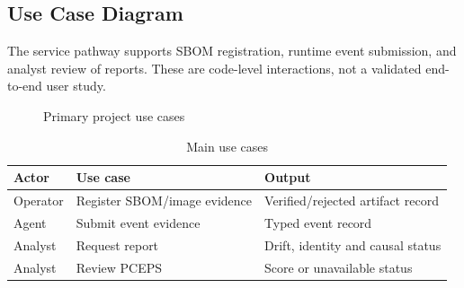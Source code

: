 \documentclass[12pt,a4paper,oneside]{report}
\begin{document}
\subsection{Use Case Diagram}
The service pathway supports SBOM registration, runtime event submission, and analyst review of reports. These are code-level interactions, not a validated end-to-end user study.
\begin{figure}[htbp]\centering{}\caption{Primary project use cases}\label{fig:usecase}\end{figure}
\begin{table}[htbp]\centering\caption{Main use cases}\begin{tabularx}{\textwidth}{p{1.3in}X X}\toprule Actor&Use case&Output\\\midrule Operator&Register SBOM/image evidence&Verified/rejected artifact record\\Agent&Submit event evidence&Typed event record\\Analyst&Request report&Drift, identity and causal status\\Analyst&Review PCEPS&Score or unavailable status\\\bottomrule\end{tabularx}\end{table}
\end{document}
